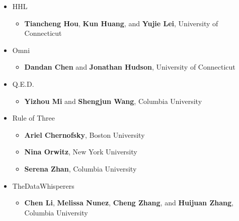 \begin{itemize}
\item HHL
  \begin{itemize}
  \item
    \textbf{Tiancheng Hou},
    \textbf{Kun Huang}, and
    \textbf{Yujie Lei}, University of Connecticut
  \end{itemize}
\item Omni
  \begin{itemize}
  \item \textbf{Dandan Chen} and
    \textbf{Jonathan Hudson}, University of Connecticut
  \end{itemize}
\item Q.E.D.
  \begin{itemize}
  \item \textbf{Yizhou Mi} and
    \textbf{Shengjun Wang}, Columbia University
  \end{itemize}
\item Rule of Three
  \begin{itemize}
  \item \textbf{Ariel Chernofsky}, Boston University
  \item \textbf{Nina Orwitz}, New York University
  \item \textbf{Serena Zhan}, Columbia University 
  \end{itemize}
\item TheDataWhisperers
  \begin{itemize}
  \item \textbf{Chen Li},
    \textbf{Melissa Nunez},
    \textbf{Cheng Zhang}, and
    \textbf{Huijuan Zhang}, Columbia University
  \end{itemize}
\end{itemize}

